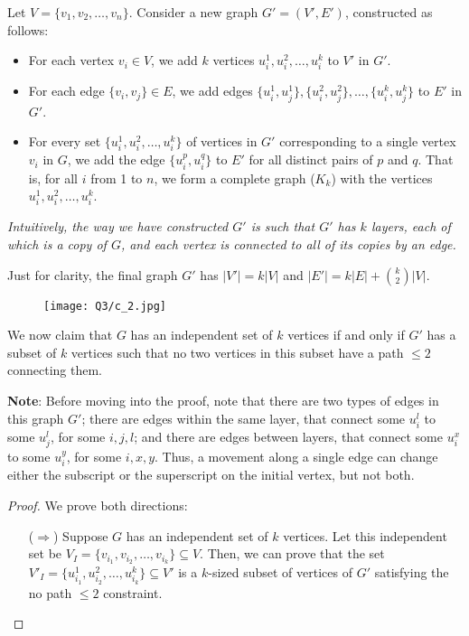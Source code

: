 \documentclass[11pt, fleqn]{article}
\begin{document}
\begin{itemize}
    Let $V = \{v_1, v_2, \dots, v_n\}$. Consider a new graph $G' = (V', E')$, constructed as follows:
    \begin{itemize}
        \item For each vertex $v_i\in V$, we add $k$ vertices $u_i^1, u_i^2, \dots, u_i^k$ to $V'$ in $G'$.
        \item For each edge $\{v_i, v_j\}\in E$, we add edges $\{u_i^1, u_j^1\}, \{u_i^2, u_j^2\} ,\dots, \{u_i^k, u_j^k\}$ to $E'$ in $G'$.
        \item For every set $\{u_i^1, u_i^2, \dots, u_i^k\}$ of vertices in $G'$ corresponding to a single vertex $v_i$ in $G$, we add the edge $\{u_i^p, u_i^q\}$ to $E'$ for all distinct pairs of $p$ and $q$. That is, for all $i$ from 1 to $n$, we form a complete graph ($K_k$) with the vertices $u_i^1, u_i^2, \dots, u_i^k$.
    \end{itemize}
    \textit{Intuitively, the way we have constructed $G'$ is such that $G'$ has $k$ layers, each of which is a copy of $G$, and each vertex is connected to all of its copies by an edge.}
    
    Just for clarity, the final graph $G'$ has $|V'| = k|V|$ and $|E'| = k|E| + {k\choose{2}}|V|$.
    
    \begin{figure}[H]
        \texttt{[image: Q3/c\_2.jpg]}
    \end{figure}
    
    We now claim that $G$ has an independent set of $k$ vertices if and only if $G'$ has a subset of $k$ vertices such that no two vertices in this subset have a path $\leq 2$ connecting them.
    
    \textbf{Note}: Before moving into the proof, note that there are two types of edges in this graph $G'$; there are edges within the same layer, that connect some $u_i^l$ to some $u_j^l$, for some $i, j, l$; and there are edges between layers, that connect some $u_i^x$ to some $u_i^y$, for some $i,x,y$. Thus, a movement along a single edge can change either the subscript or the superscript on the initial vertex, but not both.
    \begin{proof}
        We prove both directions:
        \begin{itemize}
            \item[($\Rightarrow$)]
            Suppose $G$ has an independent set of $k$ vertices. Let this independent set be $V_I = \{v_{i_1}, v_{i_2}, \dots, v_{i_k}\} \subseteq V$. Then, we can prove that the set $V'_I = \{u_{i_1}^1, u_{i_2}^2, \dots, u_{i_k}^k\} \subseteq V'$ is a $k$-sized subset of vertices of $G'$ satisfying the no path $\leq 2$ constraint.
            

\end{itemize}
\end{proof}
\end{itemize}
\end{document}
